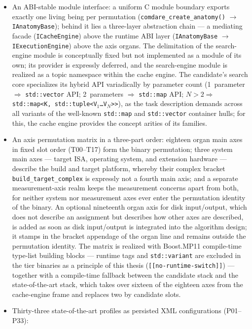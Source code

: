 \begin{itemize}
  \item An ABI-stable module interface: a uniform C module boundary exports exactly one living being
  per permutation (\texttt{comdare\_\allowbreak{}create\_anatomy()} $\to$ \texttt{IAnatomyBase}); behind it
  lies a three-layer abstraction chain --- a
  mediating facade (\texttt{ICacheEngine}) above the runtime ABI layer
  (\texttt{IAnatomyBase} $\to$ \texttt{IExecutionEngine}) above the axis organs. The delimitation of the
  search-engine module is conceptually fixed but not implemented as a module of its own; its
  provider is expressly deferred, and the search-engine module is realized as a
  topic namespace within the cache engine. The candidate's search core specializes its hybrid API variadically by
  parameter count (1~parameter $\Rightarrow$ \texttt{std::vector} API\@;
  2~parameters $\Rightarrow$ \texttt{std::map} API\@; $N>2 \Rightarrow$
  \texttt{std::map<K,\,std::tuple<V$_1$\ldots V$_N$>>}), as the task description demands across all variants
  of the well-known \texttt{std::map} and \texttt{std::vector} container hulls; for this, the cache engine
  provides the concept arities of its families.
  \item An axis permutation matrix in a three-part order: eighteen organ main axes in fixed
  slot order (T00--T17) form the binary permutation; three system main axes --- target ISA,
  operating system, and extension hardware --- describe the build and target platform, whereby their
  complex bracket \texttt{build\_target\_complex} is expressly not a fourth main axis; and a
  separate measurement-axis realm keeps the measurement concerns apart from both, for neither system nor
  measurement axes ever enter the permutation identity of the binary. An optional nineteenth
  organ axis for disk input/output, which does not describe an assignment but describes how other
  axes are described, is added as soon as disk input/output is integrated into the algorithm design;
  it stamps in the bracket appendage of the organ line and remains outside the
  permutation identity. The matrix is realized with Boost.MP11 compile-time type-list building blocks ---
  runtime tags and \texttt{std::variant} are excluded in the tier binaries as a principle of this thesis
  (\texttt{[[no-runtime-switch]]}) --- together with a compile-time fallback between the candidate stack and the
  state-of-the-art stack, which takes over sixteen of the eighteen axes from the cache-engine frame and
  replaces two by candidate slots.
  \item Thirty-three state-of-the-art profiles as persisted XML configurations (P01--P33):

\end{itemize}
